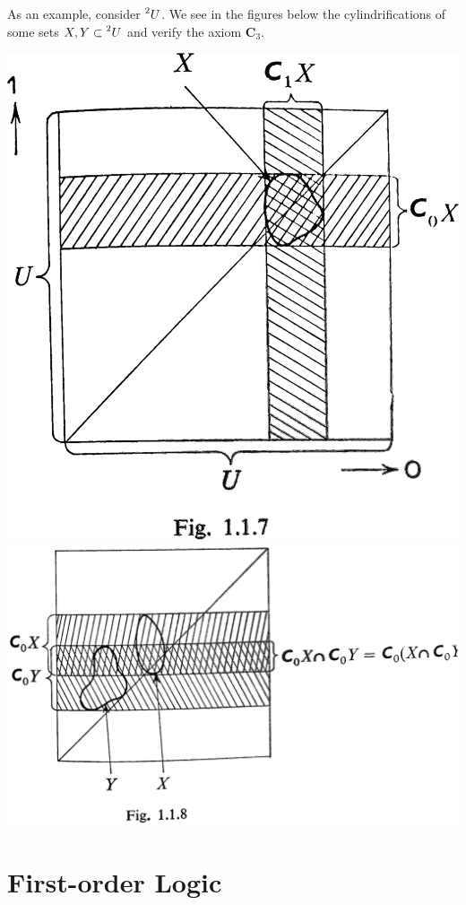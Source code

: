 \documentclass[12pt,a4paper]{article}
\begin{document}
As an example, consider $\prescript{2}{}{U}$. We see in the figures below the cylindrifications of some sets $X,Y\subset \prescript{2}{}{U}$ and verify the axiom \textbf{C$_3$}.

\includegraphics[scale=0.1]{Cylindrification1.png}
\includegraphics[scale=0.1]{Cylindrification2.png} 


\section{First-order Logic}
\end{document}

